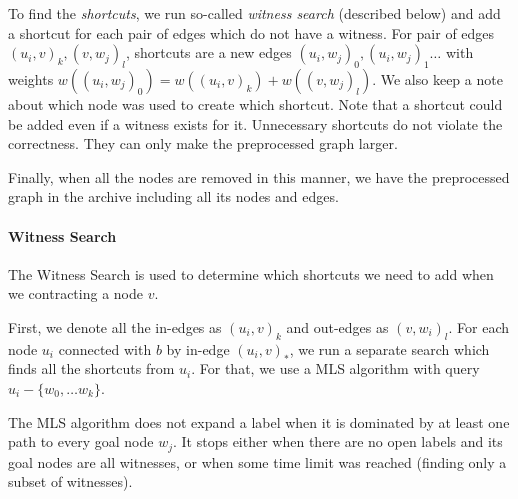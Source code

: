 To find the {\em shortcuts}, we run so-called {\em witness search} (described
below) and add a shortcut for each pair of edges which do not have a witness.
For pair of edges $(u_i,v)_k,(v,w_j)_l$, shortcuts are a new edges $(u_i,w_j)_0, (u_i,w_j)_1 \dots$ 
with weights $w((u_i,w_j)_0) = w((u_i,v)_k)+w((v,w_j)_l)$. 
We also keep a note about which node was used to create which
shortcut.
Note that a shortcut could be added even if a witness exists for it. Unnecessary shortcuts do not violate the correctness. They can only make the preprocessed graph larger.


Finally, when all the nodes are removed in this manner, we have the preprocessed graph in the archive including all its nodes and edges.

\paragraph*{Witness Search}
The Witness Search is used to determine which shortcuts we need to add when we contracting a node $v$. 

First, we denote all the in-edges as $(u_i,v)_k$ and out-edges as $(v,w_i)_l$. For each node $u_i$ connected with $b$ by in-edge $(u_i,v)_*$, we run a separate search which finds all the shortcuts from $u_i$. For that, we use a MLS algorithm with query $u_i-\{w_0,\dots w_k\}$. 

The MLS algorithm does not expand a label when it is dominated by at least one path to every goal node $w_j$. It stops either when there are no open labels and its goal nodes are all witnesses,
or when some time limit was reached (finding only a subset of witnesses). 


